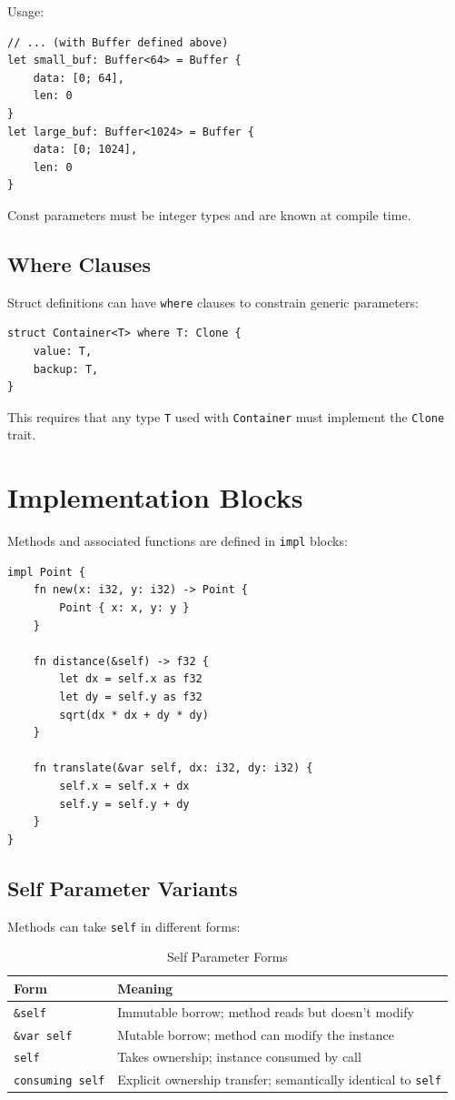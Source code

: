 Usage:

\begin{lstlisting}
// ... (with Buffer defined above)
let small_buf: Buffer<64> = Buffer {
    data: [0; 64],
    len: 0
}
let large_buf: Buffer<1024> = Buffer {
    data: [0; 1024],
    len: 0
}
\end{lstlisting}

Const parameters must be integer types and are known at compile time.

\subsection{Where Clauses}

Struct definitions can have \texttt{where} clauses to constrain generic parameters:

\begin{lstlisting}
struct Container<T> where T: Clone {
    value: T,
    backup: T,
}
\end{lstlisting}

This requires that any type \texttt{T} used with \texttt{Container} must implement the \texttt{Clone} trait.

\section{Implementation Blocks}

Methods and associated functions are defined in \texttt{impl} blocks:

\begin{lstlisting}
impl Point {
    fn new(x: i32, y: i32) -> Point {
        Point { x: x, y: y }
    }

    fn distance(&self) -> f32 {
        let dx = self.x as f32
        let dy = self.y as f32
        sqrt(dx * dx + dy * dy)
    }

    fn translate(&var self, dx: i32, dy: i32) {
        self.x = self.x + dx
        self.y = self.y + dy
    }
}
\end{lstlisting}

\subsection{Self Parameter Variants}

Methods can take \texttt{self} in different forms:

\begin{table}[h]
\centering
\begin{tabular}{lp{8cm}}
\hline
\textbf{Form} & \textbf{Meaning} \\
\hline
\texttt{\&self} & Immutable borrow; method reads but doesn't modify \\
\texttt{\&var self} & Mutable borrow; method can modify the instance \\
\texttt{self} & Takes ownership; instance consumed by call \\
\texttt{consuming self} & Explicit ownership transfer; semantically identical to \texttt{self} \\
\hline
\end{tabular}
\caption{Self Parameter Forms}
\end{table}

